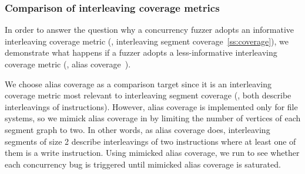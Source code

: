 \subsubsection{Comparison of interleaving coverage metrics}
\label{sss:interleavingcoverage}
%
In order to answer the question why a concurrency fuzzer adopts an
informative interleaving coverage metric (\ie, interleaving segment
coverage~\autoref{ss:coverage}), we demonstrate what happens if a
fuzzer adopts a less-informative interleaving coverage metric (\eg,
alias coverage~\cite{krace}).


%
We choose alias coverage as a comparison target since it is an
interleaving coverage metric most relevant to interleaving segment
coverage (\ie, both describe interleavings of instructions).
%
However, alias coverage is implemented only for file systems, so we
mimick alias coverage in \sys by limiting the number of vertices of
each segment graph to two. In other words, as alias coverage does,
interleaving segments of size 2 describe interleavings of two
instructions where at least one of them is a write instruction.
%
Using mimicked alias coverage, we run \sys to see whether each
concurrency bug is triggered until mimicked alias coverage is
saturated.




